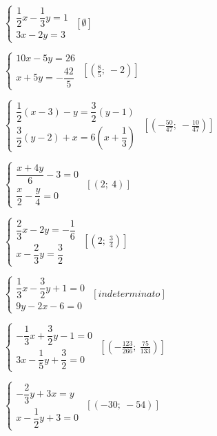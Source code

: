 \begin{esercizio}[*]
\begin{htmulticols}{2}
\begin{enumeratea}
{%
\item \(\left\{\begin{array}{l}
{\dfrac{1}{2}x-\dfrac{1}{3}y=1}\\
{3x-2y=3}\end{array}\right.\)
 \hfill \(\left[\emptyset\right]\)
\item \(\left\{\begin{array}{l}
{10x-5y=26}\\
{x+5y=-\dfrac{42}{5}}\end{array}\right.\)
 \hfill \(\left[\left(\frac{8}{5};~-2\right)\right]\)
\item \(\left\{\begin{array}{l}
\dfrac{1}{2}(x-3)-y=\dfrac{3}{2}(y-1)\\
\dfrac{3}{2}(y-2)+x=6\left(x+\dfrac{1}{3}\right)\end{array}\right.\)
 \hfill \(\left[(-\frac{50}{47};~-\frac{10}{47})\right]\)
\item \(\left\{\begin{array}{l}
\dfrac{x+4y}{6}-3=0\\
\dfrac{x}{2}-\dfrac{y}{4}=0\end{array}\right.\)
 \hfill \(\left[(2;~4)\right]\)}
{
\item 
\(\left\{\begin{array}{l}\dfrac{2}{3}x-2y=-{\dfrac{1}{6}}\\x-\dfrac{2}{3}
y=\dfrac{3}{2} \end{array}\right.\)
 \hfill \(\left[\left(2;~\frac{3}{4}\right)\right]\)
\item \(\left\{\begin{array}{l}\dfrac{1}{3}x-\dfrac{3}{2}y+1=0\\9y-2x-6=0 
\end{array}\right.\)
 \hfill \(\left[indeterminato\right]\)
\item 
\(\left\{\begin{array}{l}-{\dfrac{1}{3}}x+\dfrac{3}{2}y-1=0\\3x-\dfrac{1}{5}
y+\dfrac{3}{2}=0 \end{array}\right.\)
 \hfill \(\left[(-{\frac{123}{266}};~\frac{75}{133})\right]\)
\item \(\left\{\begin{array}{l}-{\dfrac{2}{3}}y+3x=y\\x-\dfrac{1}{2}y+3=0 
\end{array}\right.\)
 \hfill \(\left[(-30;~-54)\right]\)}
\end{enumeratea}
\end{htmulticols}
\end{esercizio}

